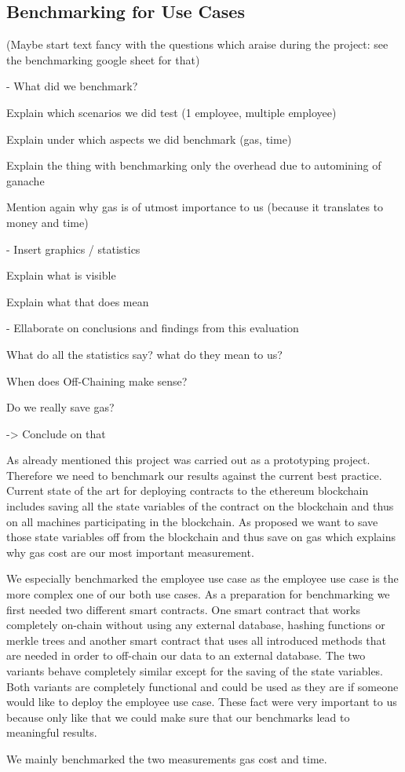 \subsection{Benchmarking for Use Cases}

(Maybe start text fancy with the questions which araise during the project: see the benchmarking google sheet for that)

- What did we benchmark?

Explain which scenarios we did test (1 employee, multiple employee)

Explain under which aspects we did benchmark (gas, time)

Explain the thing with benchmarking only the overhead due to automining of ganache

Mention again why gas is of utmost importance to us (because it translates to money and time)

- Insert graphics / statistics

Explain what is visible

Explain what that does mean

- Ellaborate on conclusions and findings from this evaluation

What do all the statistics say? what do they mean to us?

When does Off-Chaining make sense?

Do we really save gas?

-> Conclude on that

As already mentioned this project was carried out as a prototyping project. Therefore we need to benchmark our results against the current best practice. Current state of the art for deploying contracts to the ethereum blockchain includes saving all the state variables of the contract on the blockchain and thus on all machines participating in the blockchain. As proposed we want to save those state variables off from the blockchain and thus save on gas which explains why gas cost are our most important measurement.

We especially benchmarked the employee use case as the employee use case is the more complex one of our both use cases. As a preparation for benchmarking we first needed two different smart contracts. One smart contract that works completely on-chain without using any external database, hashing functions or merkle trees and another smart contract that uses all introduced methods that are needed in order to off-chain our data to an external database. The two variants behave completely similar except for the saving of the state variables. Both variants are completely functional and could be used as they are if someone would like to deploy the employee use case. These fact were very important to us because only like that we could make sure that our benchmarks lead to meaningful results. 

We mainly benchmarked the two measurements gas cost and time.

